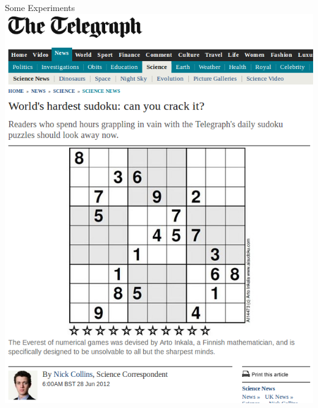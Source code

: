 \documentclass{beamer}
\begin{document}
\begin{frame}{Some Experiments}
     {
        \includegraphics*[keepaspectratio=true,scale=0.24]{hardest.png}
    }
     {
        \begin{columns}
            \begin{column}{0.45\textwidth}
                
            \end{column}
            \begin{column}{0.45\textwidth}
            \end{column}
        \end{columns}
    }
\end{frame}
\end{document}
